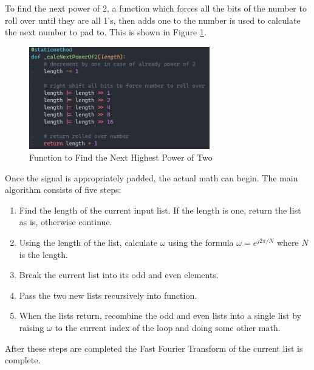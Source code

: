 \documentclass[UTF8, 12pt]{article}
\begin{document}
    To find the next power of 2, a function which forces all the bits of the number to roll over until they are all 1's, then adds one to the number is used to calculate the next number to pad to. This is shown in Figure \ref{calc2_fig}.
    \begin{figure}[h!]
        \centering
        \includegraphics[width=0.7\textwidth]{calc2.png}
        \caption{Function to Find the Next Highest Power of Two}
        \label{calc2_fig}
    \end{figure}
    Once the signal is appropriately padded, the actual math can begin. The main algorithm consists of five steps:
    \newpage
    \begin{enumerate}
        \item Find the length of the current input list. If the length is one, return the list as is, otherwise continue.
        \item Using the length of the list, calculate $\omega$ using the formula $\omega = e^{j2\pi/N}$ where $N$ is the length.
        \item Break the current list into its odd and even elements.
        \item Pass the two new lists recursively into function.
        \item When the lists return, recombine the odd and even lists into a single list by raising $\omega$ to the current index of the loop and doing some other math.
    \end{enumerate}
    After these steps are completed the Fast Fourier Transform of the current list is complete.
\end{document}
